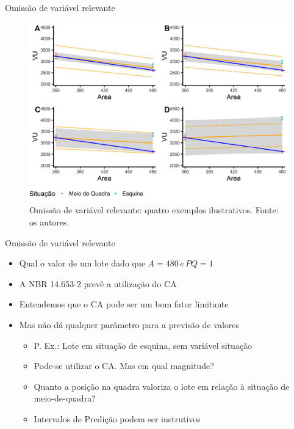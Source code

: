 \documentclass[9pt,ignorenonframetext,aspectratio=169]{beamer}
\providecommand{\tightlist}{%
  \setlength{\itemsep}{0pt}\setlength{\parskip}{0pt}}
\begin{document}
\begin{frame}{Omissão de variável relevante}
\protect\hypertarget{omissuxe3o-de-variuxe1vel-relevante}{}

\begin{figure}

{\centering \includegraphics[width=0.7\linewidth]{../../images/modelos-1} 

}

\caption{Omissão de variável relevante: quatro exemplos ilustrativos. Fonte: os autores.}\label{fig:unnamed-chunk-8}
\end{figure}

\end{frame}

\begin{frame}{Omissão de variável relevante}
\protect\hypertarget{omissuxe3o-de-variuxe1vel-relevante-1}{}

\begin{itemize}
\tightlist
\item
  Qual o valor de um lote dado que \(A = 480 \, e\, PQ = 1\)
\end{itemize}

\begin{itemize}[<+->]
\tightlist
\item
  A NBR 14.653-2 prevê a utilização do CA
\item
  Entendemos que o CA pode ser um bom fator limitante
\item
  Mas não dá qualquer parâmetro para a previsão de valores

  \begin{itemize}[<+->]
  \tightlist
  \item
    P. Ex.: Lote em situação de esquina, sem variável situação
  \item
    Pode-se utilizar o CA. Mas em qual magnitude?
  \item
    Quanto a posição na quadra valoriza o lote em relação à situação de
    meio-de-quadra?
  \item
    Intervalos de Predição podem ser instrutivos
  \end{itemize}
\end{itemize}

\end{frame}
\end{document}
